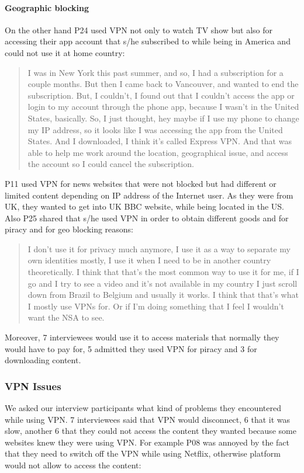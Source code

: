 \paragraph{Geographic blocking} On the other hand P24 used VPN not only to watch
TV show but also for accessing their app account that s/he subscribed to while
being in America and could not use it at home country: \begin{quote}I was in
New York this past summer, and so, I had a subscription for a couple months.
But then I came back to Vancouver, and wanted to end the subscription. But, I
couldn't, I found out that I couldn't access the app or login to my account
through the phone app, because I wasn't in the United States, basically. So, I
just thought, hey maybe if I use my phone to change my IP address, so it
looks like I was accessing the app from the United States. And I downloaded, I
think it's called Express VPN. And that was able to help me work around the
location, geographical issue, and access the account so I could cancel the
subscription.\end{quote}


P11 used VPN for news websites that were not blocked but had different or
limited content depending on IP address of the Internet user. As they were
from UK, they wanted to get into UK BBC website, while being located in the
US. Also P25 shared that s/he used VPN in order to obtain different goods and for
piracy and for geo blocking reasons: \begin{quote}I don't use it for privacy
much anymore, I use it as a way to separate my own identities mostly, I use it
when I need to be in another country theoretically. I think that that's the
most common way to use it for me, if I go and I try to see a video and it's
not available in my country I just scroll down from Brazil to Belgium and
usually it works. I think that that's what I mostly use VPNs for. Or if I'm
doing something that I feel I wouldn't want the NSA to see.\end{quote}

Moreover, 7 interviewees would use it to access materials that normally they
would have to pay for, 5 admitted they used VPN for piracy and 3 for
downloading content.

\subsubsection{VPN Issues}
We asked our
interview participants what kind of problems they encountered while using VPN.
7 interviewees said that VPN would disconnect, 6
that it was slow, another 6 that they could not access the content they wanted
because some websites knew they were using VPN. For example P08 was annoyed by the fact that they need to switch off the VPN
while using Netflix, otherwise platform would not allow to access the content:

